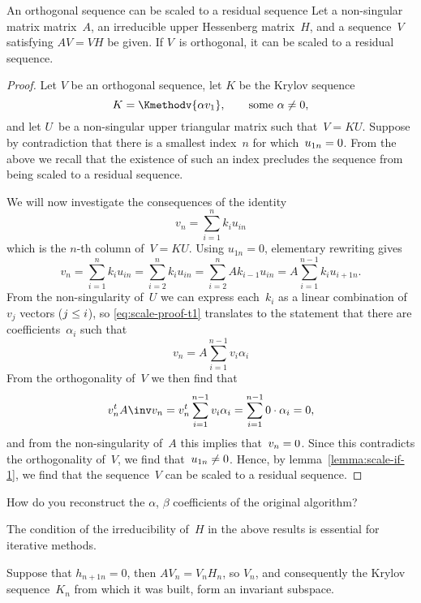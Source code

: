 \documentclass[11pt]{artikel3}
\begin{document}
\begin{Outline}
\begin{ttheorem}{An orthogonal sequence can be scaled to a residual sequence}
Let a non-singular matrix matrix~$A$,
an irreducible upper Hessenberg matrix~$H$, and
a sequence~$V$ satisfying $AV=VH$ be given.
If $V$~is orthogonal, it can be scaled to a residual sequence.
\end{ttheorem}
\begin{proof}
Let $V$ be an orthogonal sequence,
let $K$ be the Krylov sequence
    \[ K=\Kmethodv{\alpha v_1},\qquad\hbox{some $\alpha\not=0$}, \]
and let $U$~be a non-singular upper triangular matrix such that~$V=KU$.
Suppose by contradiction
that there is a smallest index~$n$ for which~$u_{1n}=\nobreak0$.
From the above we recall that the existence of such an index
precludes the sequence from being scaled to a residual sequence.

We will now investigate the consequences of the identity
\[ v_n=\sum_{i=1}^{n}k_iu_{in} \]
which is the $n$-th column of~$V=KU$.
Using $u_{1n}=0$, elementary rewriting gives
\begin{equation}
     v_n=\sum_{i=1}^nk_iu_{in}=\sum_{i=2}^nk_iu_{in}
    =\sum_{i=2}^nAk_{i-1}u_{in}=A\sum_{i=1}^{n-1}k_iu_{i+1n}.
    \label{eq:scale-proof-t1}\end{equation}
From the non-singularity of~$U$ we can express each~$k_i$ as
a linear combination of~$v_j$ vectors ($j\leq\nobreak i$),
so \eqref{eq:scale-proof-t1} translates to the statement that
there are coefficients~$\alpha_i$ such that
\[ v_n=A\sum_{i=1}^{n-1}v_i\alpha_i \]
From the orthogonality of~$V$ we then find that
\[ v_n^tA\inv v_n=v_n^t\sum_{i=1}^{n-1}v_i\alpha_i =
     \sum_{i=1}^{n-1}0\cdot\alpha_i=0, \]
and from the non-singularity of~$A$ this implies that~$v_n=\nobreak0$.
Since this contradicts the orthogonality of~$V$,
we find that~$u_{1n}\not=\nobreak0$.
Hence, by lemma~\ref{lemma:scale-if-1}, we find that the sequence~$V$
can be scaled to a residual sequence.
\end{proof}

\begin{question}
How do you reconstruct the $\alpha$, $\beta$
coefficients of the original algorithm?
\end{question}

The condition of the irreducibility of~$H$ in the above results
is essential for iterative methods. 

\begin{remark}\label{H-red}
Suppose that $h_{n+1n}=0$,
then $AV_n=V_nH_n$, so $V_n$, and consequently the Krylov sequence~$K_n$
from which it was built, form an invariant subspace.
\end{remark}


\end{Outline}
\end{document}
